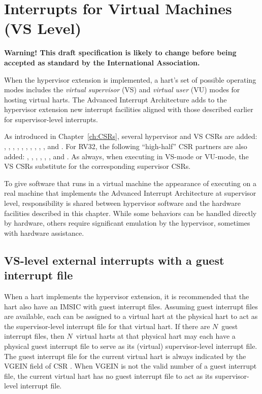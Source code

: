 
\chapter{Interrupts for Virtual Machines (VS Level)}
\label{ch:VSLevel}

\textbf{%
Warning!
This draft specification is likely to change before being accepted as
standard by the {\RISCV} International Association.%
}
\bigskip

When the hypervisor extension is implemented, a hart's set of possible
operating modes includes the \emph{virtual supervisor} (VS) and
\emph{virtual user} (VU) modes for hosting virtual harts.
The Advanced Interrupt Architecture adds to the hypervisor extension
new interrupt facilities aligned with those described earlier for
supervisor-level interrupts.

As introduced in Chapter~\ref{ch:CSRs}, several hypervisor and VS CSRs
are added:  , , , ,
, , , ,
, , and .
For RV32, the following ``high-half'' CSR partners are also added:
, , , , ,
, and .
As always, when executing in \mbox{VS-mode} or \mbox{VU-mode}, the
VS CSRs substitute for the corresponding supervisor CSRs.

To give software that runs in a virtual machine the appearance of
executing on a real machine that implements the Advanced Interrupt
Architecture at supervisor level, responsibility is shared between
hypervisor software and the hardware facilities described in this
chapter.
While some behaviors can be handled directly by hardware, others
require significant emulation by the hypervisor, sometimes with
hardware assistance.

\section{VS-level external interrupts with a guest interrupt file}

When a hart implements the hypervisor extension, it is recommended that
the hart also have an IMSIC with guest interrupt files.
Assuming guest interrupt files are available, each can be assigned
to a virtual hart at the physical hart to act as the supervisor-level
interrupt file for that virtual hart.
If there are $N$~guest interrupt files, then $N$~virtual harts at that
physical hart may each have a physical guest interrupt file to serve as
its (virtual) supervisor-level interrupt file.
The guest interrupt file for the current virtual hart is always
indicated by the VGEIN field of CSR .
When VGEIN is not the valid number of a guest interrupt file, the
current virtual hart has no guest interrupt file to act as its
supervisor-level interrupt file.

